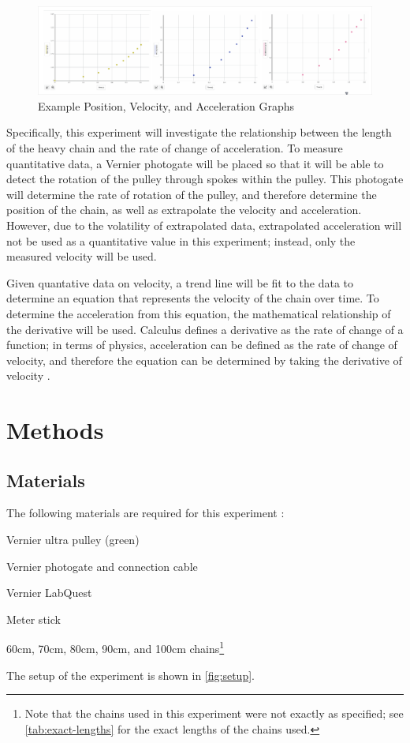 \documentclass[stu,biblatex,floatsintext,draftall]{apa7}
\begin{document}
\begin{figure}[H]
	\centering
	\caption{Example Position, Velocity, and Acceleration Graphs}
	\label{fig:example-graphs}
	\includegraphics[width=\textwidth]{example-graphs}
\end{figure}

Specifically, this experiment will investigate the relationship between the length of the heavy chain and the rate of change of acceleration. To measure quantitative data, a Vernier photogate will be placed so that it will be able to detect the rotation of the pulley through spokes within the pulley. This photogate will determine the rate of rotation of the pulley, and therefore determine the position of the chain, as well as extrapolate the velocity and acceleration. However, due to the volatility of extrapolated data, extrapolated acceleration will not be used as a quantitative value in this experiment; instead, only the measured velocity will be used.

Given quantative data on velocity, a trend line will be fit to the data to determine an equation that represents the velocity of the chain over time. To determine the acceleration from this equation, the mathematical relationship of the derivative will be used. Calculus defines a derivative as the rate of change of a function; in terms of physics, acceleration can be defined as the rate of change of velocity, and therefore the equation can be determined by taking the derivative of velocity \parencite{Johnson2020VelocityVsAcceleration}.

\section{Methods}

\subsection{Materials}
The following materials are required for this experiment \parencite{Hilsdorf2023AtwoodsHeavyChainHandout}:
\begin{APAitemize}
	\item Vernier ultra pulley (green)
	\item Vernier photogate and connection cable
	\item Vernier LabQuest
	\item Meter stick
	\item 60\unit{\centi\meter}, 70\unit{\centi\meter}, 80\unit{\centi\meter}, 90\unit{\centi\meter}, and 100\unit{\centi\meter} chains\footnote{Note that the chains used in this experiment were not exactly as specified; see \autoref{tab:exact-lengths} for the exact lengths of the chains used.}
\end{APAitemize}
The setup of the experiment is shown in \autoref{fig:setup}.
\end{document}
